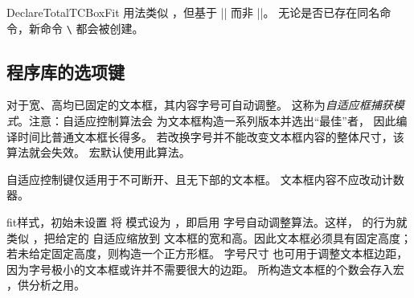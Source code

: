 \begin{docCommand}{DeclareTotalTCBoxFit}{}
  用法类似 ，但基于 |\DeclareDocumentCommand| 而非 |\NewDocumentCommand|。
  无论是否已存在同名命令，新命令 \texttt{\textbackslash} 都会被创建。
\end{docCommand}


\clearpage
\subsection{程序库的选项键}\label{subsec:fit}

对于宽、高均已固定的文本框，其内容字号可自动调整。
这称为\emph{自适应框捕获模式}。注意：自适应控制算法会
为文本框构造一系列版本并选出\enquote{最佳}者，
因此编译时间比普通文本框长得多。
若改换字号并不能改变文本框内容的整体尺寸，该算法就会失效。
 宏默认使用此算法。


\medskip
\begin{marker}
  自适应控制键仅适用于不可断开、且无下部的文本框。
  文本框内容不应改动计数器。
\end{marker}
\medskip

\enlargethispage*{5mm}
\begin{docTcbKey}{fit}{}{样式，初始未设置}
  将  模式设为 ，即启用
  字号自动调整算法。这样， 的行为就类似
  ，把给定的  自适应缩放到
  文本框的宽和高。因此文本框必须具有固定高度；
  若未给定固定高度，则构造一个正方形框。
  字号尺寸  也可用于调整文本框边距，
  因为字号极小的文本框或许并不需要很大的边距。
  所构造文本框的个数会存入宏 ，供分析之用。

\end{docTcbKey}


